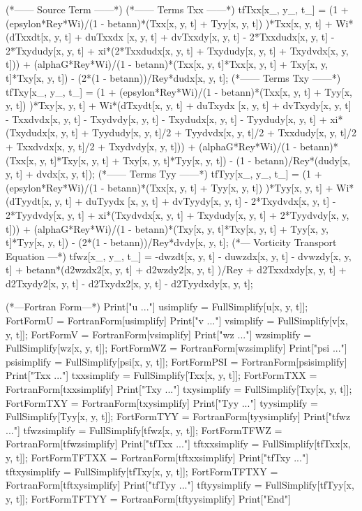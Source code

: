 \begin{mathematicacode}[caption={Cálculo dos termos fontes}, label={codigo:mathematica_4}]
(*------ Source Term ------*)
(*------  Terms Txx ------*)
tfTxx[x_, y_, t_] = (1 + (epsylon*Rey*Wi)/(1 - betann)*(Txx[x, y, t] + Tyy[x, y, t]) )*Txx[x, y, t] +  Wi*(dTxxdt[x, y, t] + duTxxdx [x, y, t] + dvTxxdy[x, y, t] - 2*Txxdudx[x, y, t] - 2*Txydudy[x, y, t] + xi*(2*Txxdudx[x, y, t] + Txydudy[x, y, t] + Txydvdx[x, y, t])) + (alphaG*Rey*Wi)/(1 - betann)*(Txx[x, y, t]*Txx[x, y, t] + Txy[x, y, t]*Txy[x, y, t]) - (2*(1 - betann))/Rey*dudx[x, y, t];
(*------  Terms Txy ------*)
tfTxy[x_, y_, t_] = (1 + (epsylon*Rey*Wi)/(1 - betann)*(Txx[x, y, t] + Tyy[x, y, t]) )*Txy[x, y, t] + Wi*(dTxydt[x, y, t] + duTxydx [x, y, t] + dvTxydy[x, y, t] - Txxdvdx[x, y, t] - Txydvdy[x, y, t] - Txydudx[x, y, t] - Tyydudy[x, y, t] + xi*(Txydudx[x, y, t] + Tyydudy[x, y, t]/2 + Tyydvdx[x, y, t]/2 + Txxdudy[x, y, t]/2 + Txxdvdx[x, y, t]/2 + Txydvdy[x, y, t])) + (alphaG*Rey*Wi)/(1 - betann)*(Txx[x, y, t]*Txy[x, y, t] + Txy[x, y, t]*Tyy[x, y, t]) - (1 - betann)/Rey*(dudy[x, y, t] + dvdx[x, y, t]);
(*------  Terms Tyy ------*)
tfTyy[x_, y_, t_] = (1 + (epsylon*Rey*Wi)/(1 - betann)*(Txx[x, y, t] + Tyy[x, y, t]) )*Tyy[x, y, t] + Wi*(dTyydt[x, y, t] + duTyydx [x, y, t] + dvTyydy[x, y, t] - 2*Txydvdx[x, y, t] - 2*Tyydvdy[x, y, t] + xi*(Txydvdx[x, y, t] + Txydudy[x, y, t] + 2*Tyydvdy[x, y, t])) + (alphaG*Rey*Wi)/(1 - betann)*(Txy[x, y, t]*Txy[x, y, t] + Tyy[x, y, t]*Tyy[x, y, t]) - (2*(1 - betann))/Rey*dvdy[x, y, t];
(*--- Vorticity Transport Equation ---*)
tfwz[x_, y_, t_] = -dwzdt[x, y, t] -  duwzdx[x, y, t] - dvwzdy[x, y, t] + betann*(d2wzdx2[x, y, t] + d2wzdy2[x, y, t] )/Rey + d2Txxdxdy[x, y, t] + d2Txydy2[x, y, t] - d2Txydx2[x, y, t] - d2Tyydxdy[x, y, t];
\end{mathematicacode}

\begin{mathematicacode}[caption={Transformando os resultados em códigos para \textit{Fortran}}, label={codigo:mathematica_5}]
(*---Fortran Form---*)
Print["u     ..."]
usimplify = FullSimplify[u[x, y, t]];
FortFormU = FortranForm[usimplify]
Print["v     ..."]
vsimplify = FullSimplify[v[x, y, t]];
FortFormV = FortranForm[vsimplify]
Print["wz    ..."]
wzsimplify = FullSimplify[wz[x, y, t]];
FortFormWZ = FortranForm[wzsimplify]
Print["psi   ..."]
psisimplify = FullSimplify[psi[x, y, t]];
FortFormPSI = FortranForm[psisimplify]
Print["Txx   ..."]
txxsimplify = FullSimplify[Txx[x, y, t]];
FortFormTXX = FortranForm[txxsimplify]
Print["Txy   ..."]
txysimplify = FullSimplify[Txy[x, y, t]];
FortFormTXY = FortranForm[txysimplify]
Print["Tyy   ..."]
tyysimplify = FullSimplify[Tyy[x, y, t]];
FortFormTYY = FortranForm[tyysimplify]
Print["tfwz  ..."]
tfwzsimplify = FullSimplify[tfwz[x, y, t]];
FortFormTFWZ = FortranForm[tfwzsimplify]
Print["tfTxx ..."]
tftxxsimplify = FullSimplify[tfTxx[x, y, t]];
FortFormTFTXX = FortranForm[tftxxsimplify]
Print["tfTxy ..."]
tftxysimplify = FullSimplify[tfTxy[x, y, t]];
FortFormTFTXY = FortranForm[tftxysimplify]
Print["tfTyy ..."]
tftyysimplify = FullSimplify[tfTyy[x, y, t]];
FortFormTFTYY = FortranForm[tftyysimplify]
Print["End"]
\end{mathematicacode}

